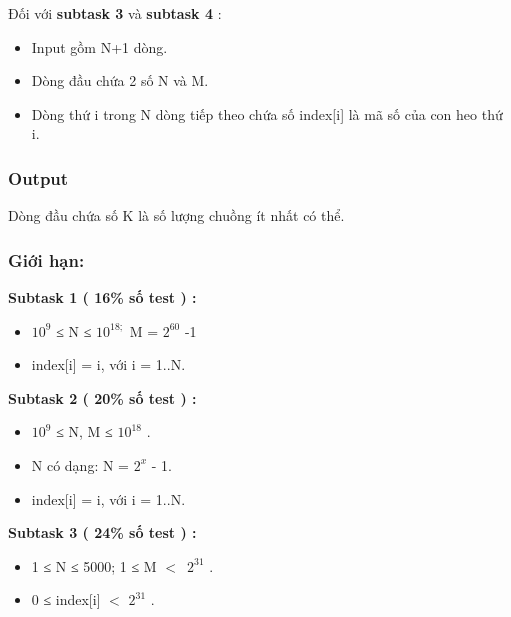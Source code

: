 Đối với \textbf{ subtask 3 } và \textbf{ subtask 4 } :
\begin{itemize}
	\item Input gồm N+1 dòng.
	\item Dòng đầu chứa 2 số N và M.
	\item Dòng thứ i trong N dòng tiếp theo chứa số index[i] là mã số của con heo thứ i.
\end{itemize}
\begin{itemize}
\end{itemize}

\subsubsection{Output}

Dòng đầu chứa số K là số lượng chuồng ít nhất có thể.
\begin{itemize}
\end{itemize}

\subsubsection{Giới hạn:}

\textbf{Subtask 1 ( 16\% số test ) : }
\begin{itemize}
	\item 

$10^{9}$ ≤ N ≤ $10^{18;}$ M = $2^{60}$ -1
	\item 

index[i] = i, với i = 1..N.
\end{itemize}

\textbf{Subtask 2 ( 20\% số test ) : }
\begin{itemize}
	\item 

$10^{9}$ ≤ N, M ≤ $10^{18}$ .
	\item 

N có dạng: N = $2^{x}$ - 1.
	\item 

index[i] = i, với i = 1..N.
\end{itemize}

\textbf{Subtask 3 ( 24\% số test ) : }
\begin{itemize}
	\item 

1 ≤ N ≤ 5000; 1 ≤ M $<$ $2^{31}$ .
	\item 

0 ≤ index[i] $<$ $2^{31}$ .
\end{itemize}

